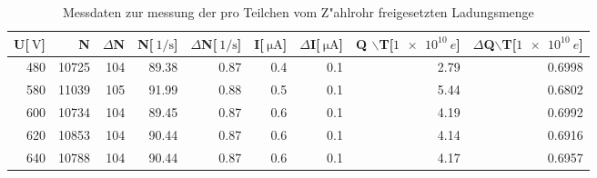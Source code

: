 
\begin{table}[!h]
\begin{center}
\begin{tabular}{|r|r|r|r|r|r|r|r|r|}
\hline
U[$\SI{}{\volt}$] & N & $\Delta$N & N[$\SI{}{1\per\second}$] & $\Delta$N[$\SI{}{1\per\second}$] & I[$\SI{}{\micro\ampere}$] & $\Delta$I[$\SI{}{\micro\ampere}$] & Q $\backslash$T[$\SI{1 e10}{e}$] & $\Delta$Q$\backslash$T[$\SI{1 e10}{e}$] \\
\hline
\hline
480	 &   10725 & 104 & 89.38  & 0.87 &	0.4	& 0.1 & 2.79 & 0.6998\\
580	 &   11039 & 105 & 91.99  & 0.88 &	0.5	& 0.1 & 5.44 & 0.6802\\
600	 &   10734 & 104 & 89.45  & 0.87 &	0.6	& 0.1 & 4.19 & 0.6992\\
620	 &   10853 & 104 & 90.44  & 0.87 &	0.6	& 0.1 & 4.14 & 0.6916\\
640	 &   10788 & 104 & 90.44  & 0.87 &	0.6	& 0.1 & 4.17 & 0.6957\\
\hline
\end{tabular}
\caption[Aufgabe e]{Messdaten zur messung der pro Teilchen vom Z"ahlrohr freigesetzten Ladungsmenge}
\label{tabellee}
\end{center}
\end{table}